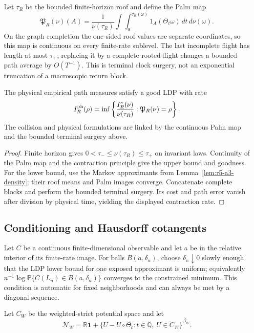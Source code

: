 Let \(\tau_R\) be the bounded finite-horizon roof and define the Palm map
\[
 \mathfrak P_R(\nu)(A)=
 \frac1{\nu(\tau_R)}
 \int\int_0^{\tau_R(\omega)}
 1_A(\Theta_t\omega)\,dt\,d\nu(\omega).
\]
On the graph completion the one-sided roof values are separate coordinates,
so this map is continuous on every finite-rate sublevel.  The last incomplete
flight has length at most \(\tau_+\); replacing it by a complete rooted flight
changes a bounded path average by \(O(T^{-1})\).  This is terminal clock
surgery, not an exponential truncation of a macroscopic return block.

\begin{theorem}
\label{thm:r5-a3-physical-ldp}
The physical empirical path measures satisfy a good LDP with rate
\[
 I_R^{\rm ph}(\rho)=
 \inf\left\{
  \frac{I_R^c(\nu)}{\nu(\tau_R)}:
  \mathfrak P_R(\nu)=\rho
 \right\}.
\]
The collision and physical formulations are linked by the continuous Palm map
and the bounded terminal surgery above.
\end{theorem}

\begin{proof}
Finite horizon gives
\(0<\tau_-\le\nu(\tau_R)\le\tau_+\) on invariant laws.  Continuity of the
Palm map and the contraction principle give the upper bound and goodness.
For the lower bound, use the Markov approximants from
Lemma~\ref{lem:r5-a3-density}; their roof means and Palm images converge.
Concatenate complete blocks and perform the bounded terminal surgery.  Its
cost and path error vanish after division by physical time, yielding the
displayed contraction rate.
\end{proof}

\subsection{Conditioning and Hausdorff cotangents}

Let \(C\) be a continuous finite-dimensional observable and let
\(a\) be in the relative interior of its finite-rate image.  For balls
\(B(a,\delta_n)\), choose \(\delta_n\downarrow0\) slowly enough that the LDP
lower bound for one exposed approximant is uniform; equivalently
\(n^{-1}\log\mathbb P\{C(L_n)\in B(a,\delta_n)\}\) converges to the constrained
minimum.  This condition is automatic for fixed neighborhoods and can always
be met by a diagonal sequence.

Let \(C_W\) be the weighted-strict potential space and let
\[
 \mathscr N_W=\overline{\mathbb R\mathbf1+
 \{U-U\circ\Theta_t:t\in\mathbb Q,\ U\in C_W\}}^{\,\beta_W}.
\]

